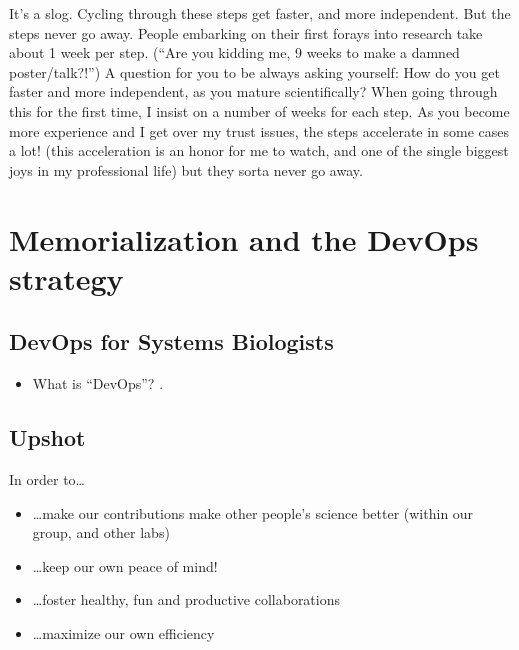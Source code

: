 \documentclass[letterpaper,10pt,english]{sphinxmanual}
\begin{document}
\sphinxAtStartPar
It’s a slog. Cycling through these steps get faster, and more independent. But the steps never go away.
People embarking on their first forays into research take about 1 week per step. (“Are you kidding me, 9 weeks to make a damned poster/talk?!”)
A question for you to be always asking yourself: How do you get faster and more independent, as you mature scientifically?
When going through this for the first time, I insist on a number of weeks for each step.
As you become more experience and I get over my trust issues, the steps accelerate \textendash{}in some cases a lot! (this acceleration is an honor for me to watch, and one of the single biggest joys in my professional life) \textendash{} but they sorta never go away.


\chapter{Memorialization and the DevOps strategy}
\label{\detokenize{03DevOps:memorialization-and-the-devops-strategy}}\label{\detokenize{03DevOps:devops}}\label{\detokenize{03DevOps::doc}}

\section{DevOps for Systems Biologists}
\label{\detokenize{03DevOps:devops-for-systems-biologists}}\begin{itemize}
\item {} 
\sphinxAtStartPar
What is “DevOps”? .

\end{itemize}


\section{Upshot}
\label{\detokenize{03DevOps:upshot}}
\sphinxAtStartPar
In order to…
\begin{itemize}
\item {} 
\sphinxAtStartPar
…make our contributions make other people’s science better (within our group, and other labs)

\item {} 
\sphinxAtStartPar
…keep our own peace of mind!

\item {} 
\sphinxAtStartPar
…foster healthy, fun and productive collaborations

\item {} 
\sphinxAtStartPar
…maximize our own efficiency

\end{itemize}
\end{document}

